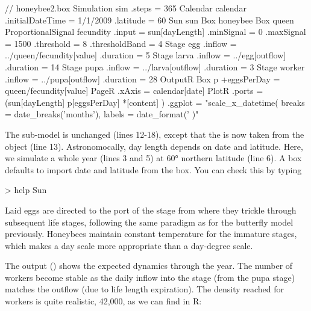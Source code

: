 \lstset{numbers=left}
\begin{boxscript}
// honeybee2.box
Simulation sim {
  .steps = 365
  Calendar calendar {
    .initialDateTime = 1/1/2009
    .latitude = 60
  }
  Sun sun {
  }
  Box honeybee {
    Box queen {
      ProportionalSignal fecundity {
        .input = sun[dayLength]
        .minSignal = 0
        .maxSignal = 1500
        .threshold = 8
        .thresholdBand = 4
      }
    }
    Stage egg {
      .inflow = ../queen/fecundity[value]
      .duration = 5
    }
    Stage larva {
      .inflow = ../egg[outflow]
      .duration = 14
    }
    Stage pupa {
      .inflow = ../larva[outflow]
      .duration = 3
    }
    Stage worker {
      .inflow = ../pupa[outflow]
      .duration = 28
    }
  }
  OutputR {
    Box p {
      +eggsPerDay = queen/fecundity[value]
    }
    PageR {
      .xAxis = calendar[date]
      PlotR {
        .ports = (sun[dayLength] 
                   p[eggsPerDay] 
                   *[content] )
        .ggplot = "scale_x_datetime( 
                     breaks = date_breaks('months'), 
                     labels = date_format('%
                    )"
      }
    }
  }
}
\end{boxscript}
\lstset{numbers=none}

The  sub-model is  unchanged (lines 12-18), except that the  is now taken from the  object (line 13). Astronomocally, day length depends on date and latitude. Here, we simulate a whole year (lines 3 and 5) at \ang{60} northern latitude (line 6). A  box defaults to import date and latitude from the  box. You can check this by typing

\begin{rdialog}
> help Sun
\end{rdialog}

Laid eggs are directed to the  port of the  stage from where they trickle through subsequent life stages, following the same paradigm as for the butterfly model previously. Honeybees maintain constant temperature for the immature stages, which makes a day scale more appropriate than a day-degree scale.

The output () shows the expected dynamics through the year. The number of workers become stable as the daily inflow into the stage (from the pupa stage) matches the outflow (due to life length expiration). The density reached for workers is quite realistic, 42,000, as we can find in R:

